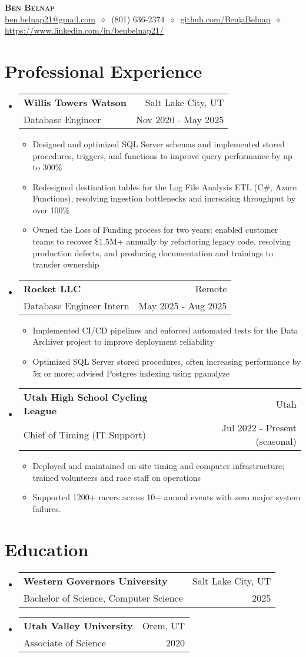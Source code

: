 \documentclass[letterpaper,11pt]{article}
\makeatletter
\newcommand{\cvitem}[1]{
  \item\small{
    {#1\vspace{-2pt}}
  }
}
\newcommand{\cvheading}[4]{
  \vspace{-2pt}\item
    \begin{tabular*}{\textwidth}[t]{l@{\extracolsep{\fill}}r}
      \textbf{#1} & #2 \\
      \small#3 & \small #4 \\
    \end{tabular*}\vspace{-7pt}
}
\newcommand{\cvheadingstart}{\begin{itemize}[leftmargin=0in, label={}]}
\newcommand{\cvheadingend}{\end{itemize}}
\newcommand{\cvitemstart}{\begin{itemize}[label=\textopenbullet]\justifying}
\newcommand{\cvitemend}{\end{itemize}\vspace{-5pt}}
\makeatother
\begin{document}
\begin{center}
  \textbf{\LARGE\scshape Ben Belnap} \\
  \vspace{1pt}\small
  \href{mailto:ben.belnap21@gmail.com}{ben.belnap21@gmail.com}
  $\ \diamond\ $ 
  (801) 636-2374
  $\ \diamond\ $
  \href{https://github.com/BenjaBelnap}{github.com/BenjaBelnap}
  $\ \diamond\ $
  \href{https://www.linkedin.com/in/benbelnap21/}{https://www.linkedin.com/in/benbelnap21/}
\end{center}

\section{Professional Experience}
\cvheadingstart
  \cvheading
    {Willis Towers Watson}{Salt Lake City, UT}
    {Database Engineer}{Nov 2020 - May 2025}
  \cvitemstart
  \cvitem{Designed and optimized SQL Server schemas and implemented stored procedures, triggers, and functions to improve query performance by up to 300\%}
  \cvitem{Redesigned destination tables for the Log File Analysis ETL (C\#, Azure Functions), resolving ingestion bottlenecks and increasing throughput by over 100\%}
  \cvitem{Owned the Loss of Funding process for two years: enabled customer teams to recover \$1.5M+ annually by refactoring legacy code, resolving production defects, and producing documentation and trainings to transfer ownership}
  \cvitemend

  \cvheading
    {Rocket LLC}{Remote}
    {Database Engineer Intern}{May 2025 - Aug 2025}
  \cvitemstart
  \cvitem{Implemented CI/CD pipelines and enforced automated tests for the Data Archiver project to improve deployment reliability}
  \cvitem{Optimized SQL Server stored procedures, often increasing performance by 5x or more; advised Postgres indexing using pganalyze}
  \cvitemend

  \cvheading
    {Utah High School Cycling League}{Utah}
    {Chief of Timing (IT Support)}{Jul 2022 - Present (seasonal)}
  \cvitemstart
  \cvitem{Deployed and maintained on-site timing and computer infrastructure; trained volunteers and race staff on operations}
  \cvitem{Supported 1200+ racers across 10+ annual events with zero major system failures.}
  \cvitemend
\cvheadingend

\section{Education}
\cvheadingstart
  \cvheading
    {Western Governors University}{Salt Lake City, UT}
    {Bachelor of Science, Computer Science}{2025}
  \cvheading
    {Utah Valley University}{Orem, UT}
    {Associate of Science}{2020}
\cvheadingend
\end{document}
